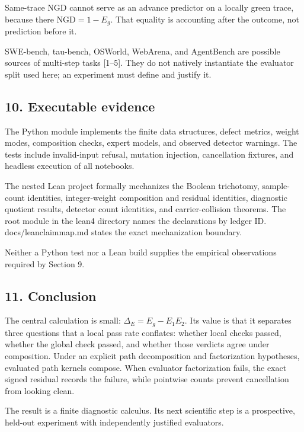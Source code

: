\documentclass[
  11pt,
]{article}
\theoremstyle{plain}
\theoremstyle{definition}\newtheorem{definition}[theorem]{Definition}
\theoremstyle{remark}\newtheorem*{remark}{Remark}
\DeclareRobustCommand{\texttt}[1]{%
  \ifmmode
    \mathtt{#1}%
  \else
    {\ttfamily\small\renewcommand{\_}{\symbol{95}\allowbreak}#1}%
  \fi}
\begin{document}
Same-trace NGD cannot serve as an advance predictor on a locally green trace,
because there \(\mathrm{NGD}=1-E_g\). That equality is accounting after the
outcome, not prediction before it.

SWE-bench, tau-bench, OSWorld, WebArena, and AgentBench are possible sources
of multi-step tasks {[}1--5{]}. They do not natively instantiate the evaluator
split used here; an experiment must define and justify it.

\subsection{10. Executable evidence}\label{executable-evidence}

The Python module implements the finite data structures, defect metrics,
weight modes, composition checks, expert models, and observed detector
warnings. The tests include invalid-input refusal, mutation injection,
cancellation fixtures, and headless execution of all notebooks.

The nested Lean project formally mechanizes the Boolean trichotomy, sample-count
identities, integer-weight composition and residual identities, diagnostic
quotient results, detector count identities, and carrier-collision theorems.
The root module in the \texttt{lean4} directory names the declarations by ledger ID.
\texttt{docs/lean\_claim\_map.md} states the exact mechanization boundary.

Neither a Python test nor a Lean build supplies the empirical observations
required by Section 9.

\subsection{11. Conclusion}\label{conclusion}

The central calculation is small:
\(\Delta_E=E_g-E_1E_2\). Its value is that it separates three questions that
a local pass rate conflates: whether local checks passed, whether the global
check passed, and whether those verdicts agree under composition. Under an
explicit path decomposition and factorization hypotheses, evaluated path
kernels compose. When evaluator factorization fails, the exact signed
residual records the failure, while pointwise counts prevent cancellation
from looking clean.

The result is a finite diagnostic calculus. Its next scientific step is a
prospective, held-out experiment with independently justified evaluators.
\end{document}
